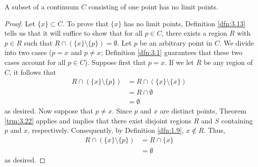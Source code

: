 \documentclass[../main.tex]{subfiles}
\begin{document}
\begin{corollary}\label{cly:3.23}
    A subset of a continuum $C$ consisting of one point has no limit points.
    \begin{proof}
        Let $\{x\}\subset C$. To prove that $\{x\}$ has no limit points, Definition \ref{dfn:3.13} tells us that it will suffice to show that for all $p\in C$, there exists a region $R$ with $p\in R$ such that $R\cap(\{x\}\setminus\{p\})=\emptyset$. Let $p$ be an arbitrary point in $C$. We divide into two cases ($p=x$ and $p\neq x$; Definition \ref{dfn:3.1} guarantees that these two cases account for all $p\in C$). Suppose first that $p=x$. If we let $R$ be any region of $C$, it follows that
        \begin{align*}
            R\cap(\{x\}\setminus\{p\}) &= R\cap(\{x\}\setminus\{x\})\\
            &= R\cap\emptyset\\
            &= \emptyset
        \end{align*}
        as desired. Now suppose that $p\neq x$. Since $p$ and $x$ are distinct points, Theorem \ref{trm:3.22} applies and implies that there exist disjoint regions $R$ and $S$ containing $p$ and $x$, respectively. Consequently, by Definition \ref{dfn:1.9}, $x\notin R$. Thus,
        \begin{align*}
            R\cap(\{x\}\setminus\{p\}) &= R\cap\{x\}\\
            &= \emptyset
        \end{align*}
        as desired.
    \end{proof}
\end{corollary}
\end{document}
